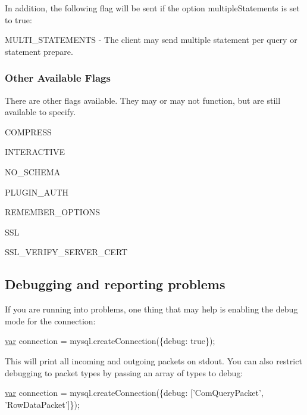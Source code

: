 In addition, the following flag will be sent if the option {\ttfamily multiple\+Statements} is set to {\ttfamily true}\+:


\begin{DoxyItemize}
\item {\ttfamily M\+U\+L\+T\+I\+\_\+\+S\+T\+A\+T\+E\+M\+E\+N\+T\+S} -\/ The client may send multiple statement per query or statement prepare.
\end{DoxyItemize}

\subsubsection*{Other Available Flags}

There are other flags available. They may or may not function, but are still available to specify.


\begin{DoxyItemize}
\item C\+O\+M\+P\+R\+E\+S\+S
\item I\+N\+T\+E\+R\+A\+C\+T\+I\+V\+E
\item N\+O\+\_\+\+S\+C\+H\+E\+M\+A
\item P\+L\+U\+G\+I\+N\+\_\+\+A\+U\+T\+H
\item R\+E\+M\+E\+M\+B\+E\+R\+\_\+\+O\+P\+T\+I\+O\+N\+S
\item S\+S\+L
\item S\+S\+L\+\_\+\+V\+E\+R\+I\+F\+Y\+\_\+\+S\+E\+R\+V\+E\+R\+\_\+\+C\+E\+R\+T
\end{DoxyItemize}

\subsection*{Debugging and reporting problems}

If you are running into problems, one thing that may help is enabling the {\ttfamily debug} mode for the connection\+:


\begin{DoxyCode}
\hyperlink{018__def_8c_a335628f2e9085305224b4f9cc6e95ed5}{var} connection = mysql.createConnection(\{debug: \textcolor{keyword}{true}\});
\end{DoxyCode}


This will print all incoming and outgoing packets on stdout. You can also restrict debugging to packet types by passing an array of types to debug\+:


\begin{DoxyCode}
\hyperlink{018__def_8c_a335628f2e9085305224b4f9cc6e95ed5}{var} connection = mysql.createConnection(\{debug: [\textcolor{stringliteral}{'ComQueryPacket'}, \textcolor{stringliteral}{'RowDataPacket'}]\});
\end{DoxyCode}


